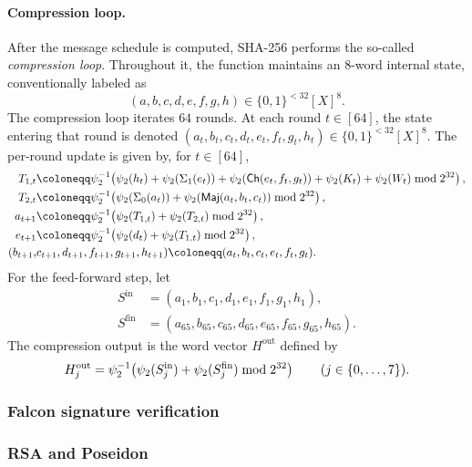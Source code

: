 \documentclass[11pt,letterpaper,usenames,dvipsnames]{article}
\begin{document}
\paragraph{Compression loop.}
After the message schedule is computed, SHA-256 performs the so-called \emph{compression loop}. Throughout it, the function maintains an $8$-word internal state, conventionally labeled as $$(a,b,c,d,e,f,g,h) \in \{0,1\}^{<32}[X]^8.$$
The compression loop iterates $64$ rounds.
At each round $t\in[64]$, the state entering that round is denoted
$(a_t,b_t,c_t,d_t,e_t,f_t,g_t,h_t)\in\{0,1\}^{<32}[X]^8$. The per-round update is given by, for $t\in [64]$,
\begin{equation*}
\begin{aligned}
T_{1,t} &\coloneqq \psi_2^{-1}\!\left(
  \psi_2(h_t)+\psi_2(\Sigma_1(e_t))+\psi_2(\Ch(e_t,f_t,g_t))
  +\psi_2(K_t)+\psi_2(W_t)\bmod 2^\wordsize\right),\\
T_{2,t} &\coloneqq \psi_2^{-1}\!\left(
  \psi_2(\Sigma_0(a_t))+\psi_2(\Maj(a_t,b_t,c_t))
  \bmod 2^\wordsize\right),\\
a_{t+1} &\coloneqq \psi_2^{-1}\!\left(
  \psi_2(T_{1,t})+\psi_2(T_{2,t})\bmod 2^\wordsize\right),\\
e_{t+1} &\coloneqq \psi_2^{-1}\!\left(
  \psi_2(d_t)+\psi_2(T_{1,t})\bmod 2^\wordsize\right),\\
(b_{t+1},&c_{t+1},d_{t+1},f_{t+1},g_{t+1},h_{t+1}) 
\coloneqq (a_t,b_t,c_t,e_t,f_t,g_t).
\end{aligned}
\end{equation*}
For the feed-forward step, let
\[
\begin{aligned}
S^{\mathrm{in}}&=(a_1,b_1,c_1,d_1,e_1,f_1,g_1,h_1),\\
S^{\mathrm{fin}}&=(a_{65},b_{65},c_{65},d_{65},
                    e_{65},f_{65},g_{65},h_{65}).
\end{aligned}
\]
The compression output is the word vector $H^{\mathrm{out}}$ defined by
\[
  H^{\mathrm{out}}_j
  =\psi_2^{-1}\!\left(
      \psi_2(S^{\mathrm{in}}_j)+\psi_2(S^{\mathrm{fin}}_j)
      \bmod 2^{32}
    \right)
  \qquad(j\in\{0,\ldots,7\}).
\]

%

\subsubsection{Falcon signature verification}
\subsubsection{RSA and Poseidon}
\end{document}
